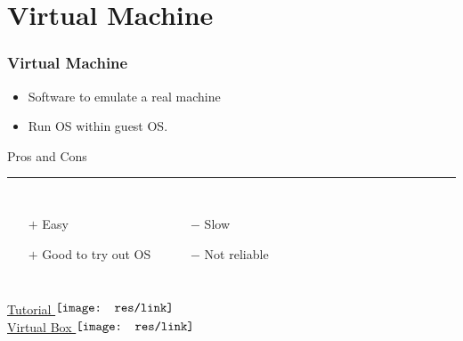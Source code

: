 \section{Virtual Machine}
\begin{frame}
	\frametitle{Virtual Machine}

    \begin{itemize}
    	\item Software to emulate a real machine
        \item Run OS within guest OS.
    \end{itemize} \vspace{0.5cm}
    
    Pros and Cons \vspace{0.1cm}
    \hrule 
    \begin{columns}[c]
            \begin{enumerate}
            	\item[$+$] Easy
                \item[$+$] Good  to try out OS
            \end{enumerate}
            \begin{enumerate}
            	\item[$-$] Slow
                \item[$-$] Not reliable
            \end{enumerate}
    \end{columns} \vspace{0.5cm}

    \href{http://www.howtogeek.com/196060/beginner-geek-how-to-create-and-use-virtual-machines/}{Tutorial $\vcenter{\hbox{\texttt{[image: res/link]}}\vspace{0.1cm}}$} \\
        \href{https://www.virtualbox.org/}{Virtual Box $\vcenter{\hbox{\texttt{[image: res/link]}}\vspace{0.1cm}}$}
\end{frame}


